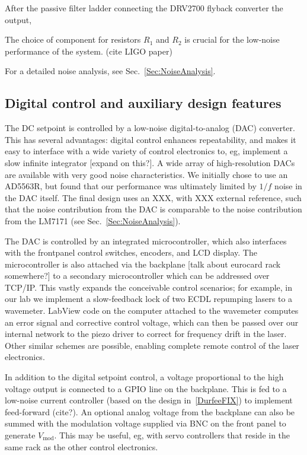\documentclass[aip,rsi,reprint]{revtex4-1} %
\begin{document}
After the passive filter ladder connecting the DRV2700 flyback converter the output,

The choice of component for resistors $R_1$ and $R_2$ is crucial for the low-noise performance of the system. (cite LIGO paper)

For a detailed noise analysis, see Sec.~\ref{Sec:NoiseAnalysis}.

\subsection{Digital control and auxiliary design features}
\label{Sec:DigControlAuxDesign}

The DC setpoint is controlled by a low-noise digital-to-analog (DAC) converter.
This has several advantages: digital control enhances repeatability, and makes it easy to interface with a wide variety of control electronics to, eg, implement a slow infinite integrator [expand on this?]. 
A wide array of high-resolution DACs are available with very good noise characteristics.
We initially chose to use an AD5563R, but found that our performance was ultimately limited by $1/f$ noise in the DAC itself.
The final design uses an XXX, with XXX external reference, such that the noise contribution from the DAC is comparable to the noise contribution from the LM7171 (see Sec.~\ref{Sec:NoiseAnalysis}).

The DAC is controlled by an integrated microcontroller, which also interfaces with the frontpanel control switches, encoders, and LCD display.
The microcontroller is also attached via the backplane [talk about eurocard rack somewhere?] to a secondary microcontroller which can be addressed over TCP/IP.
This vastly expands the conceivable control scenarios; for example, in our lab we implement a slow-feedback lock of two ECDL repumping lasers to a wavemeter. 
LabView code on the computer attached to the wavemeter computes an error signal and corrective control voltage, which can then be passed over our internal network to the piezo driver to correct for frequency drift in the laser.
Other similar schemes are possible, enabling complete remote control of the laser electronics.

In addition to the digital setpoint control, a voltage proportional to the high voltage output is connected to a GPIO line on the backplane.
This is fed to a low-noise current controller (based on the design in~\ref{DurfeeFIX}) to implement feed-forward (cite?).
An optional analog voltage from the backplane can also be summed with the modulation voltage supplied via BNC on the front panel to generate $V_{\text{mod}}$.
This may be useful, eg, with servo controllers that reside in the same rack as the other control electronics.
\end{document}
